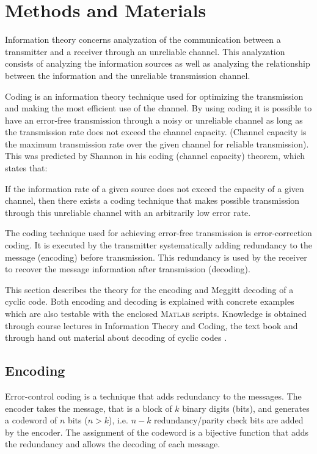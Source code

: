 \documentclass[Main]{subfiles}
\begin{document}
\section{Methods and Materials}
Information theory concerns analyzation of the communication between a transmitter and a receiver through an unreliable channel. 
This analyzation consists of analyzing the information sources as well as analyzing the relationship between the information and the unreliable transmission channel. 

Coding is an information theory technique used for optimizing the transmission and making the most efficient use of the channel.
By using coding it is possible to have an error-free transmission through a noisy or unreliable channel as long as the transmission rate does not exceed the channel capacity.
(Channel capacity is the maximum transmission rate over the given channel for reliable transmission).
This was predicted by Shannon in his coding (channel capacity) theorem, which states that: 

\begin{fquote}
If the information rate of a given source does not exceed the capacity of a given channel, then there exists a coding technique that makes possible transmission through this unreliable channel with an arbitrarily low error rate.
\end{fquote}
 
 
The coding technique used for achieving error-free transmission is error-correction coding. It is executed by the transmitter systematically adding redundancy to the message (encoding) before transmission. This redundancy is used by the receiver to recover the message information after transmission (decoding). 

This section describes the theory for the encoding and Meggitt decoding of a cyclic code. 
Both encoding and decoding is explained with concrete examples which are also testable with the enclosed \textsc{Matlab} scripts. 
Knowledge is obtained through course lectures in Information Theory and Coding, the text book \cite{book} and through hand out material about decoding of cyclic codes \cite{handout}. 

\subsection{Encoding}
Error-control coding is a technique that adds redundancy to the messages. The encoder takes the message, that is a block of $k$ binary digits (bits), and generates a codeword of $n$ bits ($n > k$), i.e. $n - k$ redundancy/parity check bits are added by the encoder. 
The assignment of the codeword is a bijective function that adds the redundancy and allows the decoding of each message. 
\end{document}
